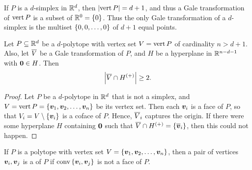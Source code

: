 If \(P\) is a \(d\)-simplex in \(\mathbb{R}^{d}\), then \(\left\lvert\operatorname{vert} P\right\rvert=d+1\), and thus a Gale transformation of \(\operatorname{vert} P\) is a subset of \(\mathbb{R}^{0}=\left\{0\right\}\).  Thus the only Gale transformation of a \(d\)-simplex is the multiset \(\left\{0,0,\dotsc,0\right\}\) of \(d+1\) equal points.

\begin{Corollary}
    Let \(P\subseteq\mathbb{R}^{d}\) be a \(d\)-polytope with vertex set \(V=\operatorname{vert} P\) of cardinality \(n>d+1\).  Also, let \(\overline{V}\) be a Gale transformation of \(P\), and \(H\) be a hyperplane in \(\mathbb{R}^{n-d-1}\) with \(\bm{0}\in H\).  Then
        \[
            \left\lvert\overline{V}\cap H^{(+)}\right\rvert\ge2.
        \]

\end{Corollary}
\begin{proof}
    Let \(P\) be a \(d\)-polytope in \(\mathbb{R}^{d}\) that is not a simplex, and \(V=\operatorname{vert} P=\left\{\bm{v}_1,\bm{v}_2,\dotsc,\bm{v}_n\right\}\) be its vertex set.  Then each \(\bm{v}_i\) is a face of \(P\), so that \(V_i=V\setminus\left\{\bm{v}_i\right\}\) is a coface of \(P\).  Hence, \(\overline{V}_i\) captures the origin.  If there were some hyperplane \(H\) containing \(\bm{0}\) such that \(\overline{V}\cap H^{(+)}=\left\{\overline{\bm{v}}_i\right\}\), then this could not happen.
\end{proof}

    If \(P\) is a polytope with vertex set \(V=\left\{\bm{v}_1,\bm{v}_2,\dotsc,\bm{v}_n\right\}\), then a pair of vertices \(\bm{v}_i,\bm{v}_j\) is a  of \(P\) if \(\operatorname{conv}\left\{\bm{v}_i,\bm{v}_j\right\}\) is not a face of  \(P\).

